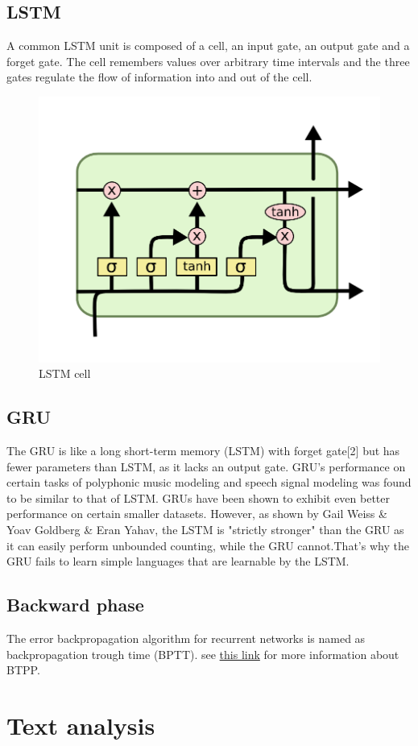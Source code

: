 \documentclass[10pt]{SelfArx} %
\begin{document}
\subsection{LSTM}
A common LSTM unit is composed of a cell, an input gate, an output gate and a forget gate. The cell remembers values over arbitrary time intervals and the three gates regulate the flow of information into and out of the cell.
\begin{figure}\centering 
	\includegraphics[width=.6\linewidth]{img/lstm}
	\caption{LSTM cell}
\end{figure}
\subsection{GRU}
The GRU is like a long short-term memory (LSTM) with forget gate[2] but has fewer parameters than LSTM, as it lacks an output gate. GRU's performance on certain tasks of polyphonic music modeling and speech signal modeling was found to be similar to that of LSTM. GRUs have been shown to exhibit even better performance on certain smaller datasets. However, as shown by Gail Weiss \& Yoav Goldberg \& Eran Yahav, the LSTM is "strictly stronger" than the GRU as it can easily perform unbounded counting, while the GRU cannot.That's why the GRU fails to learn simple languages that are learnable by the LSTM. 
\subsection{Backward phase}
The error backpropagation algorithm for recurrent networks is named as backpropagation trough time (BPTT). see  \href{https://machinelearningmastery.com/gentle-introduction-backpropagation-time/}{this link} for more information about BTPP.
\section{Text analysis}
\end{document}
